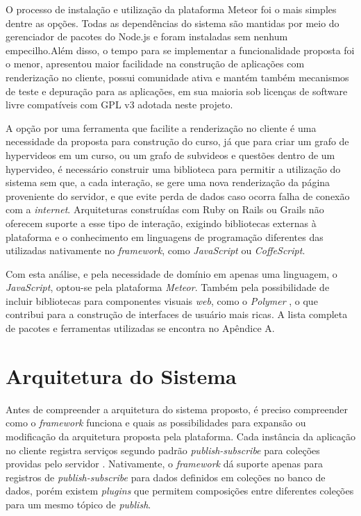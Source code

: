 O processo de instalação e utilização da plataforma Meteor foi o mais simples dentre as opções. Todas as dependências do sistema são mantidas por meio do gerenciador de pacotes do Node.js \cite{nodejs2015} e foram instaladas sem nenhum empecilho.Além disso, o tempo para se implementar a funcionalidade proposta foi o menor, apresentou maior facilidade na construção de aplicações com renderização no cliente, possui comunidade ativa e mantém também mecanismos de teste e depuração para as aplicações, em sua maioria sob licenças de software livre compatíveis com GPL v3 adotada neste projeto.

A opção por uma ferramenta que facilite a renderização no cliente é uma necessidade da proposta para construção do curso, já que para criar um grafo de hypervideos em um curso, ou um grafo de subvideos e questões dentro de um hypervideo, é necessário construir uma biblioteca para permitir a utilização do sistema sem que, a cada interação, se gere uma nova renderização da página proveniente do servidor, e que evite perda de dados caso ocorra falha de conexão com a \textit{internet}. Arquiteturas construídas com Ruby on Rails ou Grails não oferecem suporte a esse tipo de interação, exigindo bibliotecas externas à plataforma e o conhecimento em linguagens de programação diferentes das utilizadas nativamente no \textit{framework}, como \textit{JavaScript} ou \textit{CoffeScript}.

Com esta análise, e pela necessidade de domínio em apenas uma linguagem, o \textit{JavaScript}, optou-se pela plataforma \textit{Meteor}. Também pela possibilidade de incluir bibliotecas para componentes visuais \textit{web}, como o \textit{Polymer} \cite{polymer2015}, o que contribui para a construção de interfaces de usuário mais ricas. A lista completa de pacotes e ferramentas utilizadas se encontra no Apêndice A.

\section{Arquitetura do Sistema}

Antes de compreender a arquitetura do sistema proposto, é preciso compreender como o \textit{framework} funciona e quais as possibilidades para expansão ou modificação da arquitetura proposta pela plataforma. Cada instância da aplicação no cliente registra serviços segundo padrão \textit{publish-subscribe} para coleções providas pelo servidor \cite{casciaro2014}. Nativamente, o \textit{framework} dá suporte apenas para registros de \textit{publish-subscribe} para dados definidos em coleções no banco de dados, porém existem \textit{plugins} que permitem composições entre diferentes coleções para um mesmo tópico de \textit{publish}.

